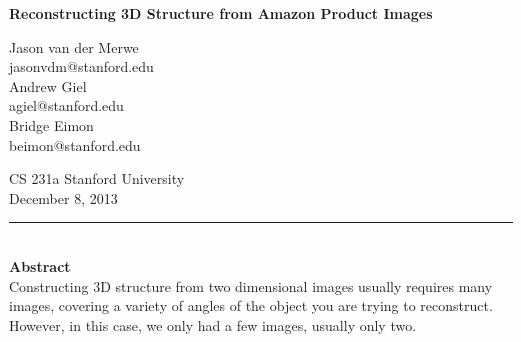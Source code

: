 \documentclass[12pt]{article}
\begin{document}
\begin{center}

{\Large \textbf{Reconstructing 3D Structure from Amazon Product Images}}

\begin{multicols}{3}
Jason van der Merwe\\
jasonvdm@stanford.edu\\
\columnbreak
Andrew Giel\\
agiel@stanford.edu\\
\columnbreak
Bridge Eimon\\
beimon@stanford.edu\\
\end{multicols}
CS 231a Stanford University\\
December 8, 2013\\
\end{center}
\noindent\rule{16.5cm}{0.4pt}\\
{\large \textbf{Abstract}}\\
Constructing 3D structure from two dimensional images usually requires many images, covering a variety of angles of the object you are trying to reconstruct. However, in this case, we only had a few images, usually only two.
\end{document}
